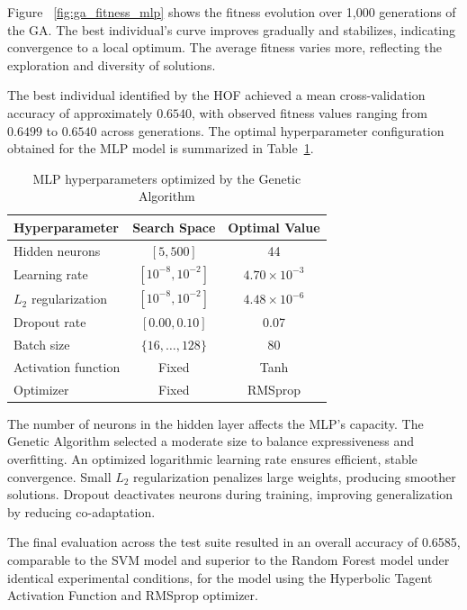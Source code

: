 \documentclass[conference]{IEEEtran}
\begin{document}
Figure ~\ref{fig:ga_fitness_mlp} shows the fitness evolution over 1,000 generations of the GA. The best individual's curve improves gradually and stabilizes, indicating convergence to a local optimum. The average fitness varies more, reflecting the exploration and diversity of solutions.

The best individual identified by the HOF achieved a mean cross-validation accuracy of approximately $0.6540$, with observed fitness values ranging from $0.6499$ to $0.6540$ across generations. The optimal hyperparameter configuration obtained for the MLP model is summarized in Table~\ref{tab:mlp_hyperparameters}.

\begin{table}[ht]
\centering
\caption{MLP hyperparameters optimized by the Genetic Algorithm}
\label{tab:mlp_hyperparameters}
\begin{tabular}{lcc}
\hline
\textbf{Hyperparameter} & \textbf{Search Space} & \textbf{Optimal Value} \\
\hline
Hidden neurons        & $[5, 500]$            & 44 \\
Learning rate         & $[10^{-8}, 10^{-2}]$  & $4.70 \times 10^{-3}$ \\
$L_2$ regularization  & $[10^{-8}, 10^{-2}]$  & $4.48 \times 10^{-6}$ \\
Dropout rate          & $[0.00, 0.10]$        & 0.07 \\
Batch size            & $\{16, \dots, 128\}$  & 80 \\
Activation function   & Fixed                 & Tanh \\
Optimizer             & Fixed                 & RMSprop \\
\hline
\end{tabular}
\end{table}

The number of neurons in the hidden layer affects the MLP's capacity. The Genetic Algorithm selected a moderate size to balance expressiveness and overfitting. An optimized logarithmic learning rate ensures efficient, stable convergence. Small $L_2$ regularization penalizes large weights, producing smoother solutions. Dropout deactivates neurons during training, improving generalization by reducing co-adaptation.

The final evaluation across the test suite resulted in an overall accuracy of 0.6585, comparable to the SVM model and superior to the Random Forest model under identical experimental conditions, for the model using the Hyperbolic Tagent Activation Function and RMSprop optimizer.
\end{document}
